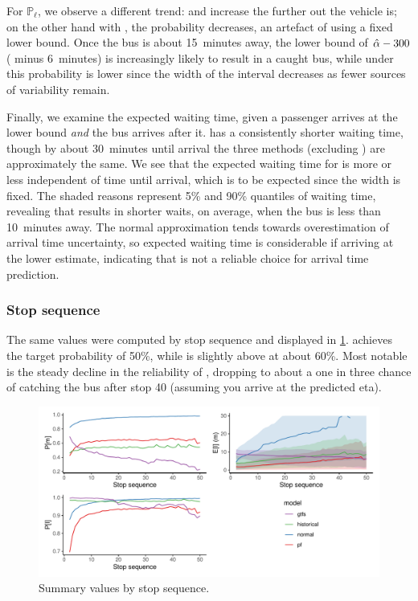 For $\mathbb{P}_\ell$, we observe a different trend: \Fpf{} and \Fhist{} increase the further out the vehicle is; on the other hand with \Fsched{}, the probability decreases, an artefact of using a fixed lower bound. Once the bus is about 15~minutes away, the lower bound of \mbox{$\hat{\alpha} - 300$} (\Fsched{} minus 6~minutes) is increasingly likely to result in a caught bus, while under \Fpf{} this probability is lower since the width of the interval decreases as fewer sources of variability remain.


Finally, we examine the expected waiting time, given a passenger arrives at the lower bound \emph{and} the bus arrives after it. \Fpf{} has a consistently shorter waiting time, though by about 30~minutes until arrival the three methods (excluding \Fnorm{}) are approximately the same. We see that the expected waiting time for \Fsched{} is more or less independent of time until arrival, which is to be expected since the width is fixed. The shaded reasons represent 5\% and 90\% quantiles of waiting time, revealing that \Fpf{} results in shorter waits, on average, when the bus is less than 10~minutes away. The normal approximation tends towards overestimation of arrival time uncertainty, so expected waiting time is considerable if arriving at the lower estimate, indicating that \Fnorm{} is not a reliable choice for arrival time prediction.


\subsubsection{Stop sequence}

The same values were computed by stop sequence and displayed in \cref{fig:model_results_pr_stop}. \Fhist{} achieves the target probability of 50\%, while \Fpf{} is slightly above at about 60\%. Most notable is the steady decline in the reliability of \Fsched{}, dropping to about a one in three chance of catching the bus after stop 40 (assuming you arrive at the predicted \gls{eta}).


\begin{knitrout}\small
{}\color{fgcolor}\begin{figure}
\includegraphics[width=\textwidth]{figure/model_results_pr_stop-1} \caption[Summary values by stop sequence]{Summary values by stop sequence.}\label{fig:model_results_pr_stop}
\end{figure}


\end{knitrout}

